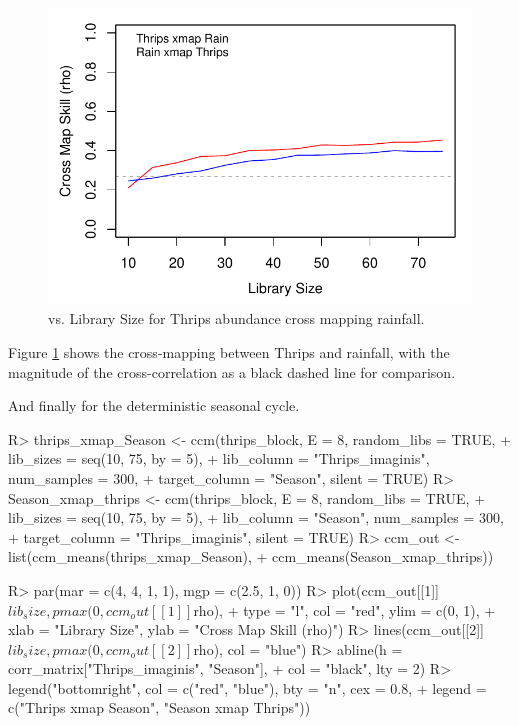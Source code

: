 \documentclass[article]{jss}
\begin{document}
\begin{figure}[t!]
\begin{center}
\includegraphics[width=5in]{article-thrips-rain-ccm}
\end{center}
\caption{\label{fig:thrips-rain-ccm}  vs. Library Size for Thrips abundance cross mapping rainfall.}
\end{figure}

Figure \ref{fig:thrips-rain-ccm} shows the cross-mapping between Thrips and rainfall, with the magnitude of the cross-correlation as a black dashed line for comparison.

And finally for the deterministic seasonal cycle.

\begin{Schunk}
\begin{Sinput}
R> thrips_xmap_Season <- ccm(thrips_block, E = 8, random_libs = TRUE,
+                            lib_sizes = seq(10, 75, by = 5), 
+                            lib_column = "Thrips_imaginis", num_samples = 300, 
+                            target_column = "Season", silent = TRUE)
R> Season_xmap_thrips <- ccm(thrips_block, E = 8, random_libs = TRUE,
+                            lib_sizes = seq(10, 75, by = 5), 
+                            lib_column = "Season", num_samples = 300, 
+                            target_column = "Thrips_imaginis", silent = TRUE)
R> ccm_out <- list(ccm_means(thrips_xmap_Season), 
+                  ccm_means(Season_xmap_thrips))
\end{Sinput}
\end{Schunk}

\begin{Schunk}
\begin{Sinput}
R> par(mar = c(4, 4, 1, 1), mgp = c(2.5, 1, 0))
R> plot(ccm_out[[1]]$lib_size, pmax(0, ccm_out[[1]]$rho), 
+       type = "l", col = "red", ylim = c(0, 1), 
+       xlab = "Library Size", ylab = "Cross Map Skill (rho)")
R> lines(ccm_out[[2]]$lib_size, pmax(0, ccm_out[[2]]$rho), col = "blue")
R> abline(h = corr_matrix["Thrips_imaginis", "Season"], 
+         col = "black", lty = 2)
R> legend("bottomright", col = c("red", "blue"), bty = "n", cex = 0.8, 
+         legend = c("Thrips xmap Season", "Season xmap Thrips"))
\end{Sinput}
\end{Schunk}
\end{document}
